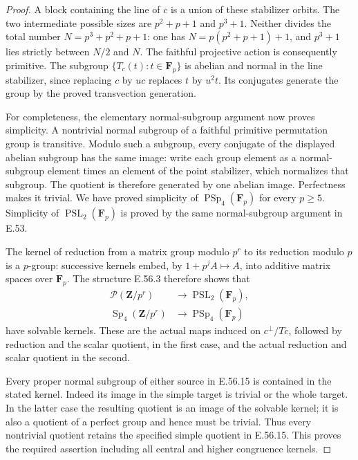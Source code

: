 \begin{proof}
A block containing the line of $c$ is a union
of these stabilizer orbits. The two intermediate
possible sizes are $p^2+p+1$ and $p^3+1$.
Neither divides the total number
$N=p^3+p^2+p+1$: one has
$N=p(p^2+p+1)+1$, and $p^3+1$ lies strictly
between $N/2$ and $N$. The faithful projective
action is consequently primitive.
The subgroup $\{T_c(t):t\in\mathbf F_p\}$ is
abelian and normal in the line stabilizer, since
replacing $c$ by $uc$ replaces $t$ by $u^2t$.
Its conjugates generate the group by the proved
transvection generation.

For completeness, the elementary normal-subgroup
argument now proves simplicity. A nontrivial normal
subgroup of a faithful primitive permutation group
is transitive. Modulo such a subgroup, every
conjugate of the displayed abelian subgroup has
the same image: write each group element as a
normal-subgroup element times an element of the
point stabilizer, which normalizes that subgroup.
The quotient is therefore generated by one
abelian image. Perfectness makes it trivial.
We have proved simplicity of
$\operatorname{PSp}_4(\mathbf F_p)$ for every
$p\ge5$. Simplicity of
$\operatorname{PSL}_2(\mathbf F_p)$ is proved
by the same normal-subgroup argument in E.53.

The kernel of reduction from a matrix group
modulo $p^r$ to its reduction modulo $p$ is
a $p$-group: successive kernels embed, by
$1+p^jA\mapsto A$, into additive matrix spaces
over $\mathbf F_p$.
The structure E.56.3 therefore shows that
\[
 \begin{split}
 \mathcal P(\mathbf Z/p^r)&\longrightarrow
                         \operatorname{PSL}_2(\mathbf F_p),\\
 \operatorname{Sp}_4(\mathbf Z/p^r)&\longrightarrow
                         \operatorname{PSp}_4(\mathbf F_p)
 \end{split}
 \tag{E.56.15}
\]
have solvable kernels. These are the actual
maps induced on $c^\perp/Tc$, followed by
reduction and the scalar quotient, in the first
case, and the actual reduction and scalar
quotient in the second.

Every proper normal subgroup of either source
in E.56.15 is contained in the stated kernel.
Indeed its image in the simple target is
trivial or the whole target. In the latter
case the resulting quotient is an image of
the solvable kernel; it is also a quotient of
a perfect group and hence must be trivial.
Thus every nontrivial quotient retains the
specified simple quotient in E.56.15.
This proves the required assertion including
all central and higher congruence kernels.


\end{proof}
